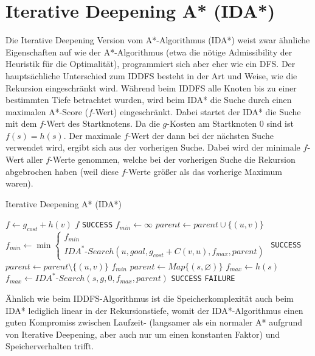 \documentclass{whswinvcbook}
\begin{document}
\section{Iterative Deepening A* (IDA*)}
Die Iterative Deepening Version vom A*-Algorithmus (IDA*) weist zwar ähnliche Eigenschaften auf wie der A*-Algorithmus (etwa die nötige Admissibility der Heuristik für die Optimalität), programmiert sich aber eher wie ein DFS. Der hauptsächliche Unterschied zum IDDFS besteht in der Art und Weise, wie die Rekursion eingeschränkt wird. Während beim IDDFS alle Knoten bis zu einer bestimmten Tiefe betrachtet wurden, wird beim IDA* die Suche durch einen maximalen A*-Score ($f$-Wert) eingeschränkt. Dabei startet der IDA* die Suche mit dem $f$-Wert des Startknotens. Da die $g$-Kosten am Startknoten $0$ sind ist $f(s)=h(s)$. Der maximale $f$-Wert der dann bei der nächsten Suche verwendet wird, ergibt sich aus der vorherigen Suche. Dabei wird der minimale $f$-Wert aller $f$-Werte genommen, welche bei der vorherigen Suche die Rekursion abgebrochen haben (weil diese $f$-Werte größer als das vorherige Maximum waren).\cite{ai}
\begin{algorithm}[H]
    \caption{Iterative Deepening A* (IDA*)}\label{alg-idastar}
    \begin{algorithmic}[1]
            \State $f\gets g_{cost}+h(v)$
                \State \Return $f$
            \EndIf
                \State \Return \texttt{SUCCESS}
            \EndIf
            \State $f_{min}\gets\infty$
                    \State $parent\gets parent\cup\{(u,v)\}$
                    \State $f_{min}\gets\min\begin{cases}f_{min}\\IDA^*\text{-}Search(u,goal,g_{cost}+C(v,u),f_{max},parent)\end{cases}$
                        \State \Return \texttt{SUCCESS}
                    \EndIf
                    \State $parent\gets parent\setminus\{(u,v)\}$
                \EndIf
            \EndFor
            \State \Return $f_{min}$
        \EndFunction
            \State $parent\gets Map\{(s,\varnothing)\}$
            \State $f_{max}\gets h(s)$
                \State $f_{max}\gets IDA^*\text{-}Search(s,g,0,f_{max},parent)$
                    \State \Return \texttt{SUCCESS}
                \EndIf
            \EndWhile
            \State \Return \texttt{FAILURE}
        \EndFunction
    \end{algorithmic}
\end{algorithm}
Ähnlich wie beim IDDFS-Algorithmus ist die Speicherkomplexität auch beim IDA* lediglich linear in der Rekursionstiefe, womit der IDA*-Algorithmus einen guten Kompromiss zwischen Laufzeit- (langsamer als ein normaler A* aufgrund von Iterative Deepening, aber auch nur um einen konstanten Faktor) und Speicherverhalten trifft.
\end{document}
